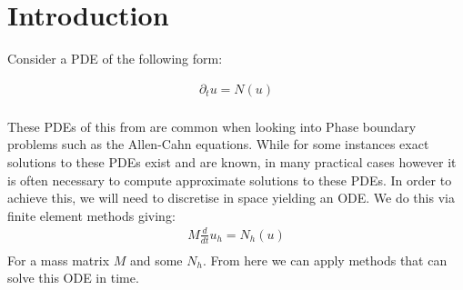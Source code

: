 \section{Introduction}

Consider a PDE of the following form:

\begin{align*}
    \partial_t u = N(u)\\
\end{align*}

These PDEs of this from are common when looking into Phase boundary problems such as the Allen-Cahn equations. %
While for some instances exact solutions to these PDEs exist and are known, in many practical cases however it is often necessary to compute approximate solutions to these PDEs.
In order to achieve this, we will need to discretise in space yielding an ODE.
We do this via finite element methods giving:
\begin{align*}
    M\frac d{dt} u_h = N_h(u)\\
\end{align*}
For a mass matrix $M$ and some $N_h$.
From here we can apply methods that can solve this ODE in time.

